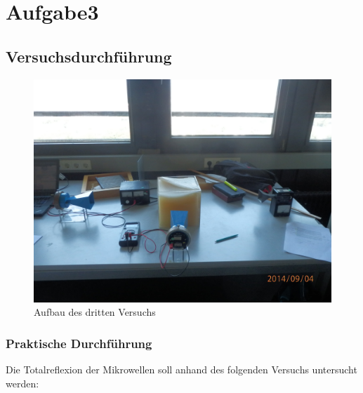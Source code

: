 \documentclass[12pt]{scrartcl}
\begin{document}
\section{Aufgabe3}
\subsection{Versuchsdurchführung}
\begin{figure}[H] 
  \centering
    \includegraphics[scale = 0.1]{a_3.JPG}
  	\caption[Aufbau des dritten Versuchs]{Aufbau des dritten Versuchs}
  \label{fig:a_3}
\end{figure}
\subsubsection{Praktische Durchführung}
Die Totalreflexion der Mikrowellen soll anhand des folgenden Versuchs untersucht werden:
\end{document}
